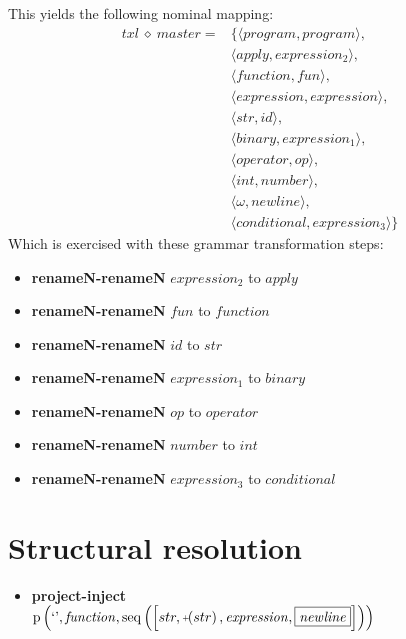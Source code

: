 This yields the following nominal mapping:
\begin{align*}\mathit{txl} \:\diamond\: \mathit{master} =& \{\langle \mathit{program},\mathit{program}\rangle,\\
 & \langle \mathit{apply},\mathit{expression_2}\rangle,\\
 & \langle \mathit{function},\mathit{fun}\rangle,\\
 & \langle \mathit{expression},\mathit{expression}\rangle,\\
 & \langle str,\mathit{id}\rangle,\\
 & \langle \mathit{binary},\mathit{expression_1}\rangle,\\
 & \langle \mathit{operator},\mathit{op}\rangle,\\
 & \langle int,\mathit{number}\rangle,\\
 & \langle \omega,\mathit{newline}\rangle,\\
 & \langle \mathit{conditional},\mathit{expression_3}\rangle\}\end{align*}
 Which is exercised with these grammar transformation steps:

{\footnotesize\begin{itemize}
\item \textbf{renameN-renameN} $\mathit{expression_2}$ to $\mathit{apply}$
\item \textbf{renameN-renameN} $\mathit{fun}$ to $\mathit{function}$
\item \textbf{renameN-renameN} $\mathit{id}$ to $str$
\item \textbf{renameN-renameN} $\mathit{expression_1}$ to $\mathit{binary}$
\item \textbf{renameN-renameN} $\mathit{op}$ to $\mathit{operator}$
\item \textbf{renameN-renameN} $\mathit{number}$ to $int$
\item \textbf{renameN-renameN} $\mathit{expression_3}$ to $\mathit{conditional}$
\end{itemize}}

\section{Structural resolution}
{\footnotesize\begin{itemize}
\item \textbf{project-inject}\\$\mathrm{p}\left(\text{`'},\mathit{function},\mathrm{seq}\left(\left[str, \plus \left(str\right), \mathit{expression}, \fbox{$\mathit{newline}$}\right]\right)\right)$
\end{itemize}}
